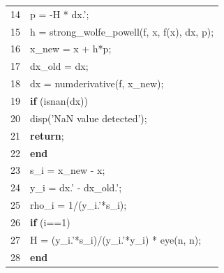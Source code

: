 \documentclass[bosnian,12pt,a4paper]{report}
\begin{document}
\begin{tabular}{ll}
14 & \hspace*{2cm}p = -H * dx.';                                                       \\
15 & \hspace*{2cm}h = strong\_wolfe\_powell(f, x, f(x), dx, p);              \\
16 & \hspace*{2cm}x_new = x + h*p;                                                                          \\
17 & \hspace*{2cm}dx_old = dx;                                                                        \\
18 & \hspace*{2cm}dx = numderivative(f, x_new);                                                                        \\
19 & \hspace*{2cm}\textbf{if} (isnan(dx))                                                                        \\
20 & \hspace*{3cm}disp('NaN value detected'); 
\\
21 & \hspace*{3cm}\textbf{return};                                                                        \\
22 & \hspace*{2cm}\textbf{end} 
\\
23 & \hspace*{2cm}s_i = x_new - x;                                                                        \\
24 & \hspace*{2cm}y_i = dx.' - dx_old.';                                    
\\
25 & \hspace*{2cm}rho_i = 1/(y_i.'*s_i);                                                                         \\
26 & \hspace*{2cm}\textbf{if} (i==1)                                                                         \\
27 & \hspace*{3cm}H = (y_i.'*s_i)/(y_i.'*y_i) * eye(n, n);                                                                         \\
28 & \hspace*{2cm}\textbf{end} 
\\

\end{tabular}
\end{document}
